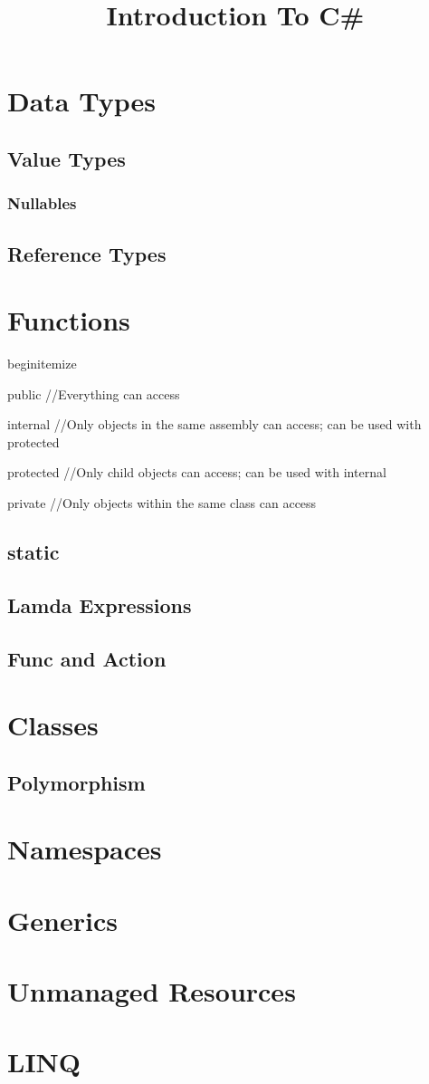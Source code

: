 \documentclass {amsart}
\title{Introduction To C\#}
\begin{document}
\maketitle



\section{Data Types}
	\subsection{Value Types}
		\subsubsection{Nullables}
	\subsection{Reference Types}

\section{Functions}
		begin{itemize}
			\item public 		//Everything can access
			\item internal 	//Only objects in the same assembly can access; can be used with protected
			\item protected	//Only child objects can access; can be used with internal
			\item private		//Only objects within the same class can access
	\subsection{static}
	\subsection{Lamda Expressions}
	\subsection{Func and Action}


\section{Classes}
	\subsection{Polymorphism}	

\section{Namespaces}

\section{Generics}

\section{Unmanaged Resources}

\section{LINQ}
\end{document}
